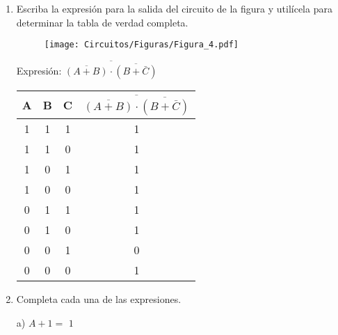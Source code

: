 \documentclass[a4paper, 12pt]{article}
\newcommand{\Aspace}{0.2cm}
\begin{document}
\begin{enumerate}
        \newpage
        \item Escriba la expresión para la salida del circuito de la figura y utilícela para determinar la tabla de verdad completa.
        \begin{figure}[!ht]
            \centering
            \texttt{[image: Circuitos/Figuras/Figura\_4.pdf]}
        \end{figure}
            \vspace{\Aspace} \par
            {   \color{azul} Expresión: $\overline{\overline{(A + B)} \cdot \overline{(B + \bar{C})}}$ \par \vspace{0.5cm}
                \begin{tabular}{c|c|c|c}
                    \textbf{A}  &   \textbf{B}  &   \textbf{C}  &   $\overline{\overline{(A + B)} \cdot \overline{(B + \bar{C})}}$     \\ \hline
                    1           &   1           &   1           &   1                                                           \\
                    1           &   1           &   0           &   1                                                           \\
                    1           &   0           &   1           &   1                                                           \\
                    1           &   0           &   0           &   1                                                           \\
                    0           &   1           &   1           &   1                                                           \\
                    0           &   1           &   0           &   1                                                           \\
                    0           &   0           &   1           &   0                                                           \\
                    0           &   0           &   0           &   1                                                           \\
                \end{tabular}
            }
        


        \item Completa cada una de las expresiones.
            \vspace{\Aspace} \par
            a) $A + 1 = $
            { \color{azul} $1$ }


\end{enumerate}
\end{document}
